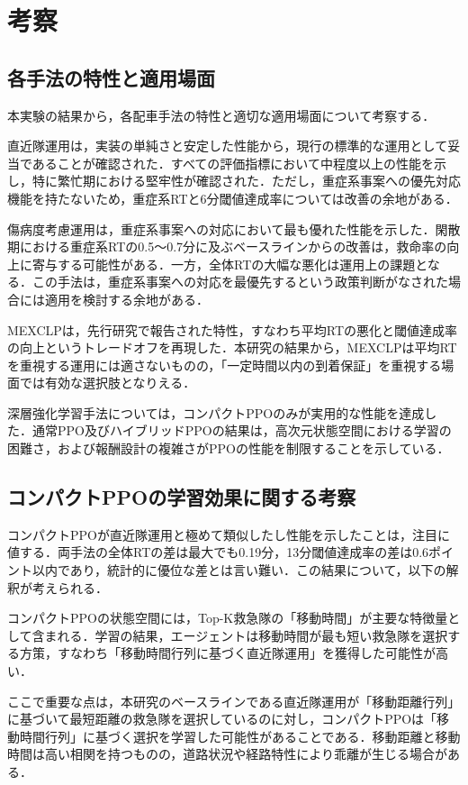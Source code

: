 \section{考察}
\subsection{各手法の特性と適用場面}
本実験の結果から，各配車手法の特性と適切な適用場面について考察する．

直近隊運用は，実装の単純さと安定した性能から，現行の標準的な運用として妥当であることが確認された．すべての評価指標において中程度以上の性能を示し，特に繁忙期における堅牢性が確認された．ただし，重症系事案への優先対応機能を持たないため，重症系RTと6分閾値達成率については改善の余地がある．

傷病度考慮運用は，重症系事案への対応において最も優れた性能を示した．閑散期における重症系RTの0.5～0.7分に及ぶベースラインからの改善は，救命率の向上に寄与する可能性がある．一方，全体RTの大幅な悪化は運用上の課題となる．この手法は，重症系事案への対応を最優先するという政策判断がなされた場合には適用を検討する余地がある．

MEXCLPは，先行研究で報告された特性，すなわち平均RTの悪化と閾値達成率の向上というトレードオフを再現した．本研究の結果から，MEXCLPは平均RTを重視する運用には適さないものの，「一定時間以内の到着保証」を重視する場面では有効な選択肢となりえる．

深層強化学習手法については，コンパクトPPOのみが実用的な性能を達成した．通常PPO及びハイブリッドPPOの結果は，高次元状態空間における学習の困難さ，および報酬設計の複雑さがPPOの性能を制限することを示している．

\subsection{コンパクトPPOの学習効果に関する考察}
コンパクトPPOが直近隊運用と極めて類似したし性能を示したことは，注目に値する．両手法の全体RTの差は最大でも0.19分，13分閾値達成率の差は0.6ポイント以内であり，統計的に優位な差とは言い難い．この結果について，以下の解釈が考えられる．

コンパクトPPOの状態空間には，Top-K救急隊の「移動時間」が主要な特徴量として含まれる．学習の結果，エージェントは移動時間が最も短い救急隊を選択する方策，すなわち「移動時間行列に基づく直近隊運用」を獲得した可能性が高い．

ここで重要な点は，本研究のベースラインである直近隊運用が「移動距離行列」に基づいて最短距離の救急隊を選択しているのに対し，コンパクトPPOは「移動時間行列」に基づく選択を学習した可能性があることである．移動距離と移動時間は高い相関を持つものの，道路状況や経路特性により乖離が生じる場合がある．

